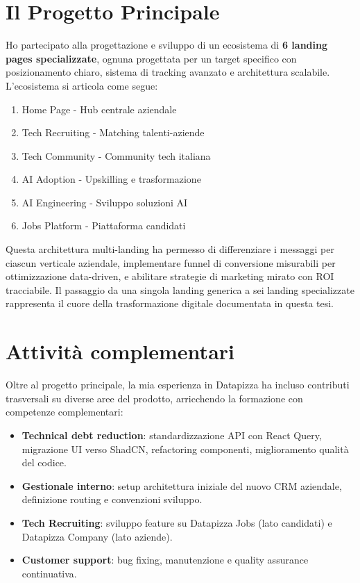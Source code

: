 \documentclass[12pt,a4paper,openright,twoside]{book}
\begin{document}
\section*{Il Progetto Principale}
Ho partecipato alla progettazione e sviluppo di un ecosistema di 
\textbf{6 landing pages specializzate}, ognuna progettata per un target 
specifico con posizionamento chiaro, sistema di tracking avanzato e 
architettura scalabile. L'ecosistema si articola come segue:

\begin{enumerate}
  \item Home Page - Hub centrale aziendale
  \item Tech Recruiting - Matching talenti-aziende
  \item Tech Community - Community tech italiana
  \item AI Adoption - Upskilling e trasformazione
  \item AI Engineering - Sviluppo soluzioni AI
  \item Jobs Platform - Piattaforma candidati
\end{enumerate}

Questa architettura multi-landing ha permesso di differenziare i messaggi per 
ciascun verticale aziendale, implementare funnel di conversione misurabili per 
ottimizzazione data-driven, e abilitare strategie di marketing mirato con ROI 
tracciabile. Il passaggio da una singola landing generica a sei landing 
specializzate rappresenta il cuore della trasformazione digitale documentata 
in questa tesi.

\section*{Attività complementari}
Oltre al progetto principale, la mia esperienza in Datapizza ha incluso 
contributi trasversali su diverse aree del prodotto, arricchendo la formazione 
con competenze complementari:

\begin{itemize}
  \item \textbf{Technical debt reduction}: standardizzazione API con 
        React Query, migrazione UI verso ShadCN, refactoring componenti, 
        miglioramento qualità del codice. 
  \item \textbf{Gestionale interno}: setup architettura iniziale del 
        nuovo CRM aziendale, definizione routing e convenzioni sviluppo.
  \item \textbf{Tech Recruiting}: sviluppo feature su Datapizza Jobs 
        (lato candidati) e Datapizza Company (lato aziende).
  \item \textbf{Customer support}: bug fixing, manutenzione e quality 
        assurance continuativa.
\end{itemize}
\end{document}

